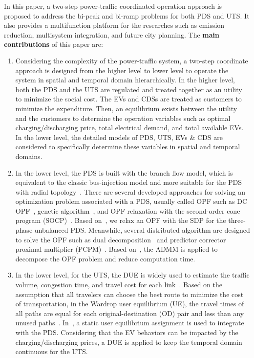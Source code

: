 \documentclass[final]{IEEEtran}
\begin{document}
In this paper, a two-step power-traffic coordinated operation approach is proposed to address the bi-peak and bi-ramp problems for both PDS and UTS. It also provides a multifunction platform for the researches such as emission reduction, multisystem integration, and future city planning. The \textbf{main contributions} of this paper are:
\begin{enumerate}
	\item Considering the complexity of the power-traffic system, a two-step coordinate approach is designed from the higher level to lower level to operate the system in spatial and temporal domain hierarchically. In the higher level, both the PDS and the UTS are regulated and treated together as an utility to minimize the social cost. The EVs and CDSs are treated as customers to minimize the expenditure. Then, an equilibrium exists between the utility and the customers to determine the operation variables such as optimal charging/discharging price, total electrical demand, and total available EVs. In the lower level, the detailed models of PDS, UTS, EVs \& CDS are considered to specifically determine these variables in spatial and temporal domains.
	
	\item In the lower level, the PDS is built with the branch flow model, which is equivalent to the classic bus-injection model and more suitable for the PDS with radial topology~\cite{suh20va09lnc}.  There are several developed approaches for solving an optimization problem associated with a PDS, usually called OPF such as DC OPF~\cite{st456ott2009dc}, genetic algorithm~\cite{b45tzs2002optil,yigu2014statistical1}, and OPF relaxation with the second-order cone program (SOCP)~\cite{pe78ng2014distributed}. Based on~\cite{pe015dis456ed,dall2013di23stributed}, we relax an OPF with the SDP for the three-phase unbalanced PDS. Meanwhile, several distributed algorithm are designed to solve the OPF such as dual decomposition~\cite{lam212dti123bud} and predictor corrector proximal multiplier (PCPM)~\cite{li2012dem45and}. Based on~\cite{pe015dis456ed,boyd2011d45istributed}, the ADMM is applied to decompose the OPF problem and reduce computation time.
	
	\item In the lower level, for the UTS, the DUE is widely used to estimate the traffic volume, congestion time, and travel cost for each link~\cite{pat015fic}. Based on the assumption that all travelers can choose the best route to minimize the cost of transportation, in the Wardrop user equilibrium (UE), the travel times of all paths are equal for each original-destination (OD) pair and less than any unused paths~\cite{jia2056514nk,sheffy1985ur123ban}. In~\cite{wei2017opt456imal}, a static user equilibrium assignment is used to integrate with the PDS. Considering that the EV behaviors can be impacted by the charging/discharging prices, a DUE is applied to keep the temporal domain continuous for the UTS.
	

\end{enumerate}
\end{document}
